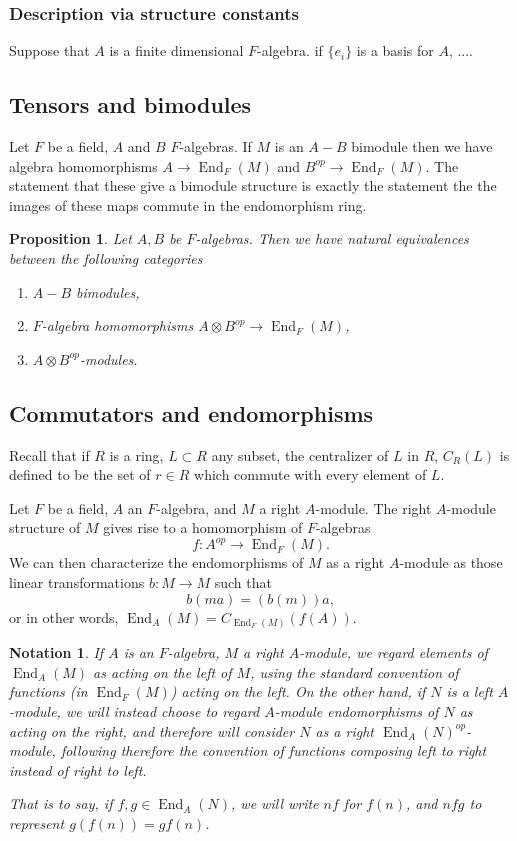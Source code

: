 \documentclass[12pt]{report}
\theoremstyle{plain}
\newtheorem{notn}[thm]{Notation}
\newtheorem{prop}[thm]{Proposition}
\newcommand{\oper}[1]{\operatorname{#1}}
\newcommand{\End}{\oper{End}}
\newcommand{\X}[1]{#1\index{#1}}
\newcommand{\todo}[1]{\textcolor{todo}{#1}}
\begin{document}
\subsubsection{Description via structure constants}

\todo{
Suppose that $A$ is a finite dimensional $F$-algebra. if $\{e_i\}$ is a basis
for $A$, ....
}

\subsection{Tensors and bimodules}

Let $F$ be a field, $A$ and $B$ $F$-algebras. If $M$ is an $A-B$
bimodule then we have algebra homomorphisms $A \to \End_F(M)$ and
$B^{op} \to \End_F(M)$. The statement that these give a bimodule structure
is exactly the statement the the images of these maps commute in the
endomorphism ring. 

\begin{prop}
Let $A, B$ be $F$-algebras. Then we have natural equivalences between the
following categories
\begin{enumerate}[1. ]
\item $A-B$ bimodules,
\item $F$-algebra homomorphisms $A \otimes B^{op} \to \End_F(M)$,
\item $A \otimes B^{op}$-modules.
\end{enumerate}
\end{prop}

\subsection{Commutators and endomorphisms}

Recall that if $R$ is a ring, $L \subset R$ any subset, the \X{centralizer}
of $L$ in $R$, $C_R(L)$ is defined to be the set of $r \in R$ which commute
with every element of $L$.

Let $F$ be a field, $A$ an $F$-algebra, and $M$ a right $A$-module. The
right $A$-module structure of $M$ gives rise to a homomorphism of
$F$-algebras
\[f : A^{op} \to \End_F(M).\]
We can then characterize the endomorphisms of $M$ as a right $A$-module as
those linear transformations $b : M \to M$ such that
\[b(ma) = (b(m)) a, \]
or in other words, $\End_A(M) = C_{\End_F(M)}(f(A))$.

\begin{notn} \label{commutators associators}
If $A$ is an $F$-algebra, $M$ a right $A$-module, we regard elements of
$\End_A(M)$ as acting on the left of $M$, using the standard convention of
functions (in $\End_F(M)$) acting on the left. On the other hand, if $N$ is
a left $A$-module, we will instead choose to regard $A$-module
endomorphisms of $N$ as acting on the right, and therefore will consider
$N$ as a right $\End_A(N)^{op}$-module, following therefore the convention
of functions composing left to right instead of right to left.

That is to say, if $f, g \in \End_A(N)$, we will write $nf$ for $f(n)$, and
$nfg$ to represent $g(f(n)) = gf(n)$.
\end{notn}
\end{document}
